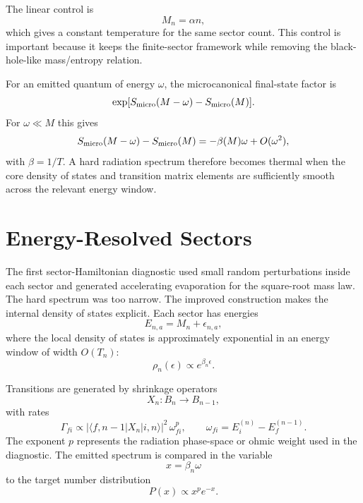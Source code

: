 \documentclass[aps,prd,onecolumn,longbibliography,nofootinbib]{revtex4-2}
\newcommand{\Smicro}{S_{\rm micro}}
\begin{document}
The linear control is
\begin{equation}
    M_n=\alpha n ,
\end{equation}
which gives a constant temperature for the same sector count.  This control is
important because it keeps the finite-sector framework while removing the
black-hole-like mass/entropy relation.

For an emitted quantum of energy $\omega$, the microcanonical final-state
factor is
\begin{equation}
    \exp[\Smicro(M-\omega)-\Smicro(M)] .
\end{equation}
For $\omega\ll M$ this gives
\begin{equation}
    \Smicro(M-\omega)-\Smicro(M)
    =
    -\beta(M)\omega+O(\omega^2),
\end{equation}
with $\beta=1/T$.  A hard radiation spectrum therefore becomes thermal when
the core density of states and transition matrix elements are sufficiently
smooth across the relevant energy window.

\section{Energy-Resolved Sectors}
\label{sec:energy-resolved}

The first sector-Hamiltonian diagnostic used small random perturbations inside
each sector and generated accelerating evaporation for the square-root mass
law.  The hard spectrum was too narrow.  The improved construction makes
the internal density of states explicit.  Each sector has energies
\begin{equation}
    E_{n,a}=M_n+\epsilon_{n,a},
\end{equation}
where the local density of states is approximately exponential in an energy
window of width $O(T_n)$:
\begin{equation}
    \rho_n(\epsilon)\propto e^{\beta_n \epsilon}.
\end{equation}

Transitions are generated by shrinkage operators
\begin{equation}
    X_n:B_n\rightarrow B_{n-1},
\end{equation}
with rates
\begin{equation}
    \Gamma_{f i}\propto
    |\langle f,n-1|X_n|i,n\rangle|^2\,
    \omega_{fi}^{p},
    \qquad
    \omega_{fi}=E_i^{(n)}-E_f^{(n-1)}.
\end{equation}
The exponent $p$ represents the radiation phase-space or ohmic weight used in
the diagnostic.  The emitted spectrum is compared in the variable
\begin{equation}
    x=\beta_n\omega
\end{equation}
to the target number distribution
\begin{equation}
    P(x)\propto x^p e^{-x}.
\end{equation}
\end{document}
